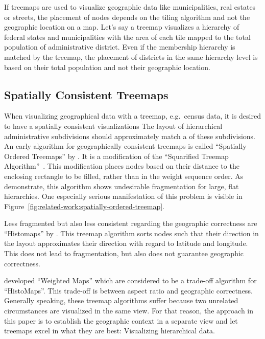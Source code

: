 If treemaps are used to visualize geographic data like municipalities, real estates or streets, the placement of nodes depends on the tiling algorithm and not the geographic location on a map.
Let's say a treemap visualizes a hierarchy of federal states and municipalities with the area of each tile mapped to the total population of administrative district.
Even if the membership hierarchy is matched by the treemap, the placement of districts in the same hierarchy level is based on their total population and not their geographic location.

\subsection{Spatially Consistent Treemaps}\label{sec:related-work:spatially-consistent-treemaps}
When visualizing geographical data with a treemap, e.g.\ census data, it is desired to have a spatially consistent visualizations
The layout of hierarchical administrative subdivisions should approximately match a \gv{} of these subdivisions.
An early algorithm for geographically consistent treemaps is called ``Spatially Ordered Treemaps'' by \textcite{Wood2008}.
It is a modification of the ``Squarified Treemap Algorithm''~\parencite{Bruls2000}.
This modification places nodes based on their distance to the enclosing rectangle to be filled, rather than in the weight sequence order.
As \textcite{Ghoniem2015} demonstrate, this algorithm shows undesirable fragmentation for large, flat hierarchies.
One especially serious manifestation of this problem is visible in Figure~\ref{fig:related-work:spatially-ordered-treemap}.

Less fragmented but also less consistent regarding the geographic correctness are ``Histomaps'' by \textcite{Keim2002}.
This treemap algorithm sorts nodes such that their direction in the layout approximates their direction with regard to latitude and longitude.
This does not lead to fragmentation, but also does not guarantee geographic correctness.

\textcite{Ghoniem2015} developed ``Weighted Maps'' which are considered to be a trade-off algorithm for ``HistoMaps''.
This trade-off is between aspect ratio and geographic correctness.
Generally speaking, these treemap algorithms suffer because two unrelated circumstances are visualized in the same view.
For that reason, the approach in this paper is to establish the geographic context in a separate view and let treemaps excel in what they are best:
Visualizing hierarchical data.

